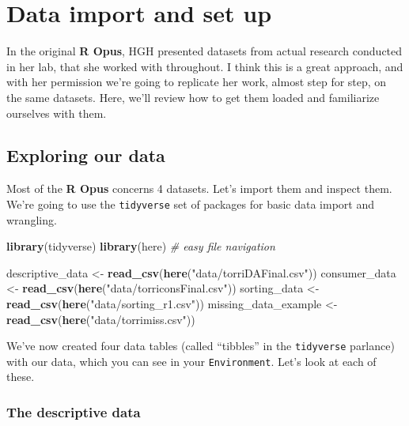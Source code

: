 \documentclass[
]{book}
\newenvironment{Shaded}{\begin{snugshade}}{\end{snugshade}}
\newcommand{\CommentTok}[1]{\textcolor[rgb]{0.56,0.35,0.01}{\textit{#1}}}
\newcommand{\FunctionTok}[1]{\textcolor[rgb]{0.13,0.29,0.53}{\textbf{#1}}}
\newcommand{\NormalTok}[1]{#1}
\newcommand{\OtherTok}[1]{\textcolor[rgb]{0.56,0.35,0.01}{#1}}
\newcommand{\StringTok}[1]{\textcolor[rgb]{0.31,0.60,0.02}{#1}}
\begin{document}
\chapter{Data import and set up}\label{data-import-and-set-up}

In the original \textbf{R Opus}, HGH presented datasets from actual research conducted in her lab, that she worked with throughout. I think this is a great approach, and with her permission we're going to replicate her work, almost step for step, on the same datasets. Here, we'll review how to get them loaded and familiarize ourselves with them.

\section{Exploring our data}\label{exploring-our-data}

Most of the \textbf{R Opus} concerns 4 datasets. Let's import them and inspect them. We're going to use the \texttt{tidyverse} set of packages for basic data import and wrangling.

\begin{Shaded}
\begin{Highlighting}[]
\FunctionTok{library}\NormalTok{(tidyverse)}
\FunctionTok{library}\NormalTok{(here) }\CommentTok{\# easy file navigation}

\NormalTok{descriptive\_data }\OtherTok{\textless{}{-}} \FunctionTok{read\_csv}\NormalTok{(}\FunctionTok{here}\NormalTok{(}\StringTok{"data/torriDAFinal.csv"}\NormalTok{))}
\NormalTok{consumer\_data }\OtherTok{\textless{}{-}} \FunctionTok{read\_csv}\NormalTok{(}\FunctionTok{here}\NormalTok{(}\StringTok{"data/torriconsFinal.csv"}\NormalTok{))}
\NormalTok{sorting\_data }\OtherTok{\textless{}{-}} \FunctionTok{read\_csv}\NormalTok{(}\FunctionTok{here}\NormalTok{(}\StringTok{"data/sorting\_r1.csv"}\NormalTok{))}
\NormalTok{missing\_data\_example }\OtherTok{\textless{}{-}}\FunctionTok{read\_csv}\NormalTok{(}\FunctionTok{here}\NormalTok{(}\StringTok{"data/torrimiss.csv"}\NormalTok{))}
\end{Highlighting}
\end{Shaded}

We've now created four data tables (called ``tibbles'' in the \texttt{tidyverse} parlance) with our data, which you can see in your \texttt{Environment}. Let's look at each of these.

\subsection{The descriptive data}\label{the-descriptive-data}
\end{document}
